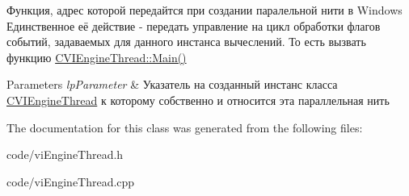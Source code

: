 Функция, адрес которой передайтся при создании паралельной нити в Windows Единственное её действие -\/ передать управление на цикл обработки флагов событий, задаваемых для данного инстанса вычеслений. То есть вызвать функцию \hyperlink{class_c_v_i_engine_thread_a24ed1bd13eea28048ed010e65697e578}{C\+V\+I\+Engine\+Thread\+::\+Main()} 


\begin{DoxyParams}{Parameters}
{\em lp\+Parameter} & Указатель на созданный инстанс класса \hyperlink{class_c_v_i_engine_thread}{C\+V\+I\+Engine\+Thread} к которому собственно и относится эта параллельная нить \\
\hline
\end{DoxyParams}


The documentation for this class was generated from the following files\+:\begin{DoxyCompactItemize}
\item 
code/vi\+Engine\+Thread.\+h\item 
code/vi\+Engine\+Thread.\+cpp\end{DoxyCompactItemize}
